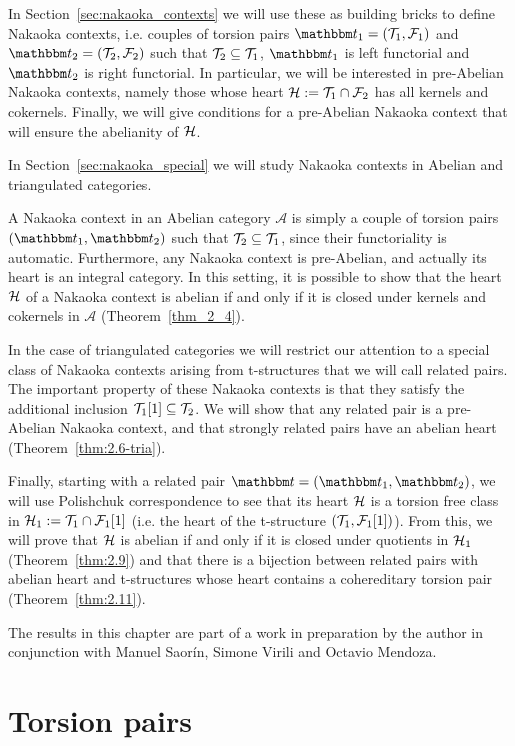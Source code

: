 In Section~\ref{sec:nakaoka_contexts} we will use these as building bricks to define Nakaoka contexts, i.e. couples of torsion pairs $\t_1=(\T_1,\F_1)$ and $\t_2=(\T_2,\F_2)$ such that $\mathcal{T}_2\subseteq \mathcal{T}_1$, $\t_1$ is left functorial and $\t_2$ is right functorial. In particular, we will be interested in pre-Abelian Nakaoka contexts, namely those whose heart $\mathcal{H}:=\mathcal{T}_1\cap\mathcal{F}_2$ has all kernels and cokernels. Finally, we will give conditions for a pre-Abelian Nakaoka context that will ensure the abelianity of $\mathcal{H}$.

In Section~\ref{sec:nakaoka_special} we will study Nakaoka contexts in Abelian and triangulated categories.

A Nakaoka context in an Abelian category $\mathscr{A}$ is simply a couple of torsion pairs $(\t_1,\t_2)$ such that $\mathcal{T}_2\subseteq\mathcal{T}_1$, since their functoriality is automatic. Furthermore, any Nakaoka context is pre-Abelian, and actually its heart is an integral category. In this setting, it is possible to show that the heart $\mathcal{H}$ of a Nakaoka context is abelian if and only if it is closed under kernels and cokernels in $\mathscr{A}$ (Theorem~\ref{thm_2_4}).

In the case of triangulated categories we will restrict our attention to a special class of Nakaoka contexts arising from t-structures that we will call related pairs. The important property of these Nakaoka contexts is that they satisfy the additional inclusion $\mathcal{T}_1[1]\subseteq\mathcal{T}_2$. We will show that any related pair is a pre-Abelian Nakaoka context, and that strongly related pairs have an abelian heart (Theorem~\ref{thm:2.6-tria}).

Finally, starting with a related pair $\t=(\t_1,\t_2)$, we will use Polishchuk correspondence to see that its heart $\mathcal{H}$ is a torsion free class in $\mathcal{H}_1:=\mathcal{T}_1\cap\mathcal{F}_1[1]$ (i.e. the heart of the t-structure $(\mathcal{T}_1,\mathcal{F}_1[1])$). From this, we will prove that $\mathcal{H}$ is abelian if and only if it is closed under quotients in $\mathcal{H}_1$ (Theorem~\ref{thm:2.9}) and that there is a bijection between related pairs with abelian heart and t-structures whose heart contains a cohereditary torsion pair (Theorem~\ref{thm:2.11}).

The results in this chapter are part of a work in preparation by the author in conjunction with Manuel Saor\'in, Simone Virili and Octavio Mendoza.

\section{Torsion pairs}\label{sec:torsion_pairs}

